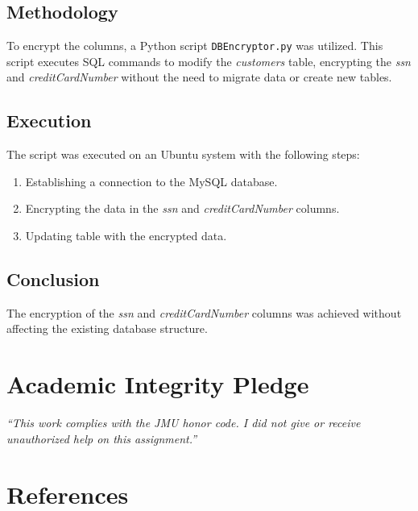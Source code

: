 \documentclass{article}
\begin{document}
\subsection*{Methodology}
To encrypt the columns, a Python script \texttt{DBEncryptor.py} was utilized. This script executes SQL commands to modify the \textit{customers} table, encrypting the \textit{ssn} and \textit{creditCardNumber} without the need to migrate data or create new tables.

\subsection*{Execution}
The script was executed on an Ubuntu system with the following steps:
\begin{enumerate}
    \item Establishing a connection to the MySQL database.
    \item Encrypting the data in the \textit{ssn} and \textit{creditCardNumber} columns.
    \item Updating table with the encrypted data.
\end{enumerate}

\subsection*{Conclusion}
The encryption of the \textit{ssn} and \textit{creditCardNumber} columns was achieved without affecting the existing database structure. 

\vfill
  \section*{Academic Integrity Pledge}
    {\color{red}\textit{“This work complies with the JMU honor code. I did not give or receive unauthorized help on this assignment.”}}
    
\newpage
\section*{References}
\end{document}
